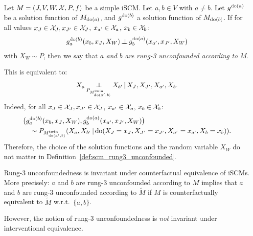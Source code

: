 \begin{Def}\label{def:scm_rung3_unconfounded}
  Let $M = \left ( J, V, W, \mathcal{X}, P, f \right )$ be a simple iSCM.
  Let $a, b \in V$ with $a \ne b$.
  Let $g^{\operatorname{do}(a)}$ be a solution function of $M_{\operatorname{do}(a)}$, and $g^{\operatorname{do}(b)}$ a solution function of $M_{\operatorname{do}(b)}$.
  If for all values $x_J \in \mathcal{X}_J, x_{J'} \in \mathcal{X}_J$, $x_{a'} \in \mathcal{X}_a$, $x_b \in \mathcal{X}_b$: 
  $$g^{\operatorname{do}(b)}_a(x_b,x_J,X_W) \operatorname*{\perp\mkern-11mu\perp} g^{\operatorname{do}(a)}_b(x_{a'},x_{J'},X_W)$$
  with $X_W \sim P$, then we say that \emph{$a$ and $b$ are rung-3 unconfounded according to $M$}.
\end{Def}
\begin{Rem}\label{rem:scm_rung3_unconfounded}
  This is equivalent to:
  $$X_a \operatorname*{\perp\mkern-11mu\perp}_{P_{M^{\mathrm{twin}}_{\operatorname{do}(a',b)}}} X_{b'} \operatorname*{|} X_J, X_{J'}, X_{a'}, X_b.$$
  Indeed, for all $x_J \in \mathcal{X}_J, x_{J'} \in \mathcal{X}_J$, $x_{a'} \in \mathcal{X}_a$, $x_b \in \mathcal{X}_b$:
  \begin{equation*}\begin{split}
    & \big(g^{\operatorname{do}(b)}_a(x_b,x_J,X_W), g^{\operatorname{do}(a)}_b(x_{a'},x_{J'},X_W)\big) \\
    & \quad \sim P_{M^{\mathrm{twin}}_{\operatorname{do}(a',b)}}(X_a,X_{b'} \operatorname*{|} \operatorname{do}(X_J=x_J,X_{J'}=x_{J'},X_{a'}=x_{a'},X_b=x_b)).
  \end{split}\end{equation*}
  Therefore, the choice of the solution functions and the random variable $X_W$ do not matter in Definition~\ref{def:scm_rung3_unconfounded}.
\end{Rem}
\begin{Rem}\label{rem:scm_rung3_unconfounded_counterfactual_equivalence}
  Rung-3 unconfoundedness is invariant under counterfactual equivalence of iSCMs.
  More precisely: $a$ and $b$ are rung-3 unconfounded according to $M$ implies that $a$ and $b$ are rung-3 unconfounded according to $\tilde{M}$ if $M$ is counterfactually equivalent to $\tilde{M}$ w.r.t.\ $\{a,b\}$.
\end{Rem}
However, the notion of rung-3 unconfoundedness is \emph{not} invariant under interventional equivalence.
